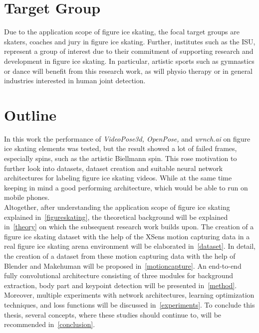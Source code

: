 \section{Target Group}
Due to the application scope of figure ice skating, the focal target groups are skaters, coaches and jury in figure ice skating.
Further, institutes such as the \gls{ISU}, represent a group of interest due to their commitment of supporting research and development
in figure ice skating.
In particular, artistic sports such as gymnastics or dance will benefit from this research work, as will physio therapy or
in general industries interested in human joint detection.

    \section{Outline}
    In this work the performance of \textit{VideoPose3d, OpenPose,} and \textit{wrnch.ai} on figure ice skating elements was tested,
but the result showed a lot of failed frames, especially spins, such as the artistic Biellmann spin.
This rose motivation to further look into datasets, dataset creation and suitable neural network architectures for labeling
figure ice skating videos. While at the same time keeping in mind a good performing architecture, which would be able to run on mobile phones.\\
Altogether, after understanding the application scope of figure ice skating explained in~\autoref{figureskating}, the theoretical
background will be explained in~\autoref{theory} on which the subsequent research work builds upon.
The creation of a figure ice skating dataset with the help of the XSens motion capturing data in a
    real figure ice skating arena
    environment will be elaborated in~\autoref{dataset}.
    In detail, the creation of a dataset from these motion capturing data with the help of Blender and
    Makehuman will be proposed in~\autoref{motioncapture}.
    An end-to-end fully convolutional architecture consisting of three modules for background extraction,
    body part and keypoint detection will be presented in~\autoref{method}.
    Moreover, multiple experiments with network architectures, learning optimization techniques, and loss functions will be discussed
    in~\autoref{experiments}.
    To conclude this thesis, several concepts, where these studies should continue to, will be recommended in~\autoref{conclusion}.



